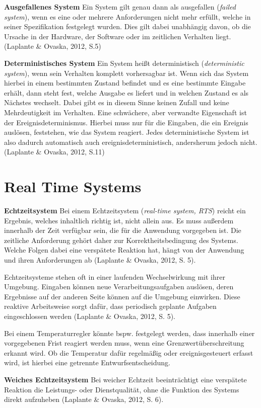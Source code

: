 \textbf{Ausgefallenes System} Ein System gilt genau dann als ausgefallen (\emph{failed} \emph{system}), wenn es eine oder mehrere Anforderungen nicht mehr erfüllt, welche in seiner Spezifikation festgelegt wurden. Dies gilt dabei unabhängig davon, ob die Ursache in der Hardware, der Software oder im zeitlichen Verhalten liegt. (Laplante \& Ovaska, 2012, S.5)

\textbf{Deterministisches System }Ein System heißt deterministisch (\emph{deterministic} \emph{system}), wenn sein Verhalten komplett vorhersagbar ist. Wenn sich das System hierbei in einem bestimmten Zustand befindet und es eine bestimmte Eingabe erhält, dann steht fest, welche Ausgabe es liefert und in welchen Zustand es als Nächstes wechselt. Dabei gibt es in diesem Sinne keinen Zufall und keine Mehrdeutigkeit im Verhalten. Eine schwächere, aber verwandte Eigenschaft ist der Ereignisdeterminismus. Hierbei muss nur für die Eingaben, die ein Ereignis auslösen, feststehen, wie das System reagiert. Jedes deterministische System ist also dadurch automatisch auch ereignisdeterministisch, andersherum jedoch nicht. (Laplante \& Ovaska, 2012, S.11)

\section{Real Time Systems}
\textbf{Echtzeitsystem} Bei einem Echtzeitsystem (\emph{real-time system, RTS}) reicht ein Ergebnis, welches inhaltlich richtig ist, nicht allein aus. Es muss außerdem innerhalb der Zeit verfügbar sein, die für die Anwendung vorgegeben ist. Die zeitliche Anforderung gehört daher zur Korrektheitsbedingung des Systems. Welche Folgen dabei eine verspätete Reaktion hat, hängt von der Anwendung und ihren Anforderungen ab (Laplante \& Ovaska, 2012, S. 5).

Echtzeitsysteme stehen oft in einer laufenden Wechselwirkung mit ihrer Umgebung. Eingaben können neue Verarbeitungsaufgaben auslösen, deren Ergebnisse auf der anderen Seite können auf die Umgebung einwirken. Diese reaktive Arbeitsweise sorgt dafür, dass periodisch geplante Aufgaben eingeschlossen werden (Laplante \& Ovaska, 2012, S. 5).

Bei einem Temperaturregler könnte bspw. festgelegt werden, dass innerhalb einer vorgegebenen Frist reagiert werden muss, wenn eine Grenzwertüberschreitung erkannt wird. Ob die Temperatur dafür regelmäßig oder ereignisgesteuert erfasst wird, ist hierbei eine getrennte Entwurfsentscheidung.

\textbf{Weiches Echtzeitsystem} Bei weicher Echtzeit beeinträchtigt eine verspätete Reaktion die Leistungs- oder Dienstqualität, ohne die Funktion des Systems direkt aufzuheben (Laplante \& Ovaska, 2012, S. 6).


